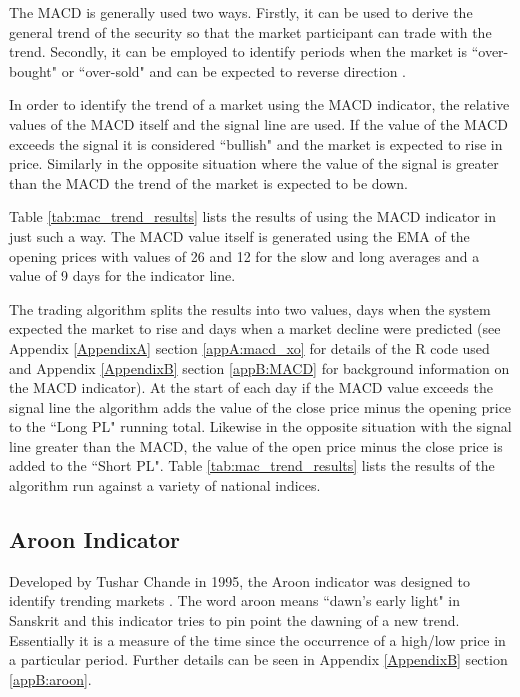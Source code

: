The MACD is generally used two ways. Firstly, it can be used to derive the general trend of the security so that the market participant can trade with the trend. Secondly, it can be employed to identify periods when the market is \textquotedblleft over-bought" or \textquotedblleft over-sold" and can be expected to reverse direction \citep{MACD2}.

In order to identify the trend of a market using the MACD indicator, the relative values of the MACD itself and the signal line are used. If the value of the MACD exceeds the signal it is considered \textquotedblleft bullish" and the market is expected to rise in price. Similarly in the opposite situation where the value of the signal is greater than the MACD the trend of the market is expected to be down. 

Table \ref{tab:mac_trend_results} lists the results of using the MACD indicator in just such a way. The MACD value itself is generated using the EMA of the opening prices with values of 26 and 12 for the slow and long averages and a value of 9 days for the indicator line. 

The trading algorithm splits the results into two values, days when the system expected the market to rise and days when a market decline were predicted (see Appendix \ref{AppendixA} section \ref{appA:macd_xo} for details of the R code used and Appendix \ref{AppendixB} section \ref{appB:MACD} for background information on the MACD indicator). At the start of each day if the MACD value exceeds the signal line the algorithm adds the value of the close price minus the opening price to the \textquotedblleft Long PL" running total. Likewise in the opposite situation with the signal line greater than the MACD, the value of the open price minus the close price is added to the \textquotedblleft Short PL". Table \ref{tab:mac_trend_results} lists the results of the algorithm run against a variety of national indices.




\subsection{Aroon Indicator}
Developed by Tushar Chande in 1995, the Aroon indicator was designed to identify trending markets \citep{aroon_stockcharts}. The word aroon means \textquotedblleft dawn's early light" in Sanskrit and this indicator tries to pin point the dawning of a new trend.  Essentially it is a measure of the time since the occurrence of a high/low price in a particular period. Further details can be seen in Appendix \ref{AppendixB} section \ref{appB:aroon}.

